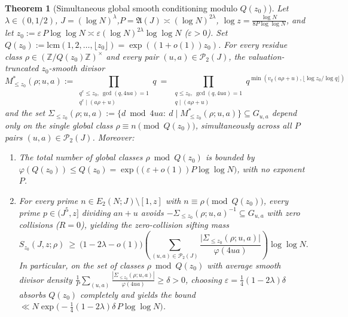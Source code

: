 \documentclass[11pt, a4paper]{article}
\theoremstyle{plain}
\newtheorem{theorem}{Theorem}[section]
\theoremstyle{definition}
\newcommand{\Z}{\mathbb{Z}}
\begin{document}
\begin{theorem}[Simultaneous global smooth conditioning modulo $Q(z_0)$]\label{thm:simultaneous_smooth_conditioning}
Let $\lambda\in(0,1/2)$, $J=(\log N)^{\lambda}$,\linebreak $P=\mathfrak{A}(J)\asymp(\log N)^{2\lambda}$, $\log z=\frac{\log N}{8P\log\log N}$, and let $z_0:=\varepsilon\,P\log\log N\asymp\varepsilon(\log N)^{2\lambda}\log\log N$ ($\varepsilon>0$). Set $Q(z_0):=\mathrm{lcm}(1,2,\dots,\lfloor z_0\rfloor)=\exp((1+o(1))z_0)$. For every residue class $\rho\in(\Z/Q(z_0)\Z)^{\times}$ and every pair $(u,a)\in\mathcal{P}_2(J)$, the valuation-truncated $z_0$-smooth divisor
\[
M_{\le z_0}^{\ast}(\rho;u,a):=\prod_{\substack{q^{e}\le z_0,\ \gcd(q,4ua)=1\\ q^{e}\mid(a\rho+u)}}q\ =\ \prod_{\substack{q\le z_0,\ \gcd(q,4ua)=1\\ q\mid(a\rho+u)}}q^{\min(v_q(a\rho+u),\lfloor\log z_0/\log q\rfloor)}
\]
and the set $\Sigma_{\le z_0}(\rho;u,a):=\big\{d\bmod 4ua:\ d\mid M_{\le z_0}^{\ast}(\rho;u,a)\big\}\subseteq G_{u,a}$ depend \emph{only on the single global class $\rho\equiv n\pmod{Q(z_0)}$}, simultaneously across all $P$ pairs $(u,a)\in\mathcal{P}_2(J)$. Moreover:
\begin{enumerate}[label=(\alph*)]
    \item The total number of global classes $\rho\bmod Q(z_0)$ is bounded by $\varphi(Q(z_0))\le Q(z_0)=\exp\big((\varepsilon+o(1))P\log\log N\big)$, with \emph{no exponent $P$}.
    
    \item For every prime $n\in E_2(N;J)\setminus[1,z]$ with $n\equiv\rho\pmod{Q(z_0)}$, every prime $p\in(J^{5},z]$ dividing $an+u$ avoids $-\Sigma_{\le z_0}(\rho;u,a)^{-1}\subseteq G_{u,a}$ with \emph{zero collisions ($R=0$)}, yielding the zero-collision sifting mass
    \[
    S_{z_0}(J,z;\rho)\ \ge\ \big(1-2\lambda-o(1)\big)\left(\sum_{(u,a)\in\mathcal{P}_2(J)}\frac{\big|\Sigma_{\le z_0}(\rho;u,a)\big|}{\varphi(4ua)}\right)\log\log N.
    \]
    In particular, on the set of classes $\rho\bmod Q(z_0)$ with average smooth divisor density $\frac1P\sum_{(u,a)}\allowbreak\frac{|\Sigma_{\le z_0}(\rho;u,a)|}{\varphi(4ua)}\allowbreak\ge\allowbreak\delta>0$, choosing $\varepsilon=\frac14(1-2\lambda)\delta$ absorbs $Q(z_0)$ completely and yields the bound $\ll N\exp\big(-\frac14(1-2\lambda)\delta\,P\log\log N\big)$.
\end{enumerate}
\end{theorem}
\end{document}
